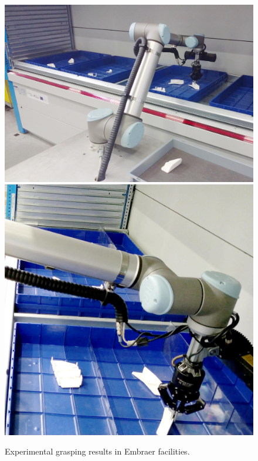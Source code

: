 \begin{figure}[h!]
{\begin{tcolorbox}
	\includegraphics[height=.15\textheight]{Cap5/Figuras/picking_embraer/back-6}
	\includegraphics[height=.15\textheight]{Cap5/Figuras/picking_embraer/side-6}
	\end{tcolorbox}
	\caption{Experimental grasping results in Embraer facilities.}
	\label{fig:embraer_result}
}
\end{figure}




